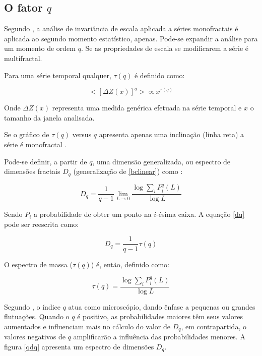 \documentclass{ufscThesis}
\begin{document}
\subsection{O fator $q$}
Segundo , a análise de invariância de escala aplicada a séries monofractais é aplicada ao segundo momento estatístico, apenas. Pode-se expandir a análise para um momento de ordem $q$. Se as propriedades de escala se modificarem a série é multifractal. \par
Para uma série temporal qualquer, $\tau(q)$ é definido como:

\begin{equation}
<[\Delta Z(x)]^{q}>  \propto x^{\tau(q)}
\label{medida}
\end{equation}

Onde $\Delta Z(x)$ representa uma medida genérica efetuada na série temporal e $x$ o tamanho da janela analisada. \par
Se o gráfico de $\tau(q)$ versus $q$ apresenta apenas uma inclinação (linha reta) a série é monofractal \cite{Biswas2012}.

Pode-se definir, a partir de $q$, uma dimensão generalizada, ou espectro de dimensões fractais $D_{q}$ (generalização de \ref{bclinear}) como \cite{feder1988fractals,Chhabra1989}:

\begin{equation}
D_{q} = \frac{1}{q-1} \lim_{L\rightarrow0} \frac{\log\sum_{i} P_{i}^{q}(L)}{\log L}
\label{dq}
\end{equation}

Sendo $P_{i}$ a probabilidade de obter um ponto na $i$-ésima caixa. A equação \ref{dq} pode ser reescrita como:

\begin{equation}
D_{q} = \frac{1}{q-1} \tau(q)
\end{equation}

O espectro de massa ($\tau(q)$) é, então, definido como:

\begin{equation}
\tau(q) = \frac{\log\sum_{i} P_{i}^{q}(L)}{\log L}
\end{equation}

Segundo , o índice $q$ atua como microscópio, dando ênfase a pequenas ou grandes flutuações. Quando o $q$ é positivo, as probabilidades maiores têm seus valores aumentados e influenciam mais no cálculo do valor de $D_{q}$, em contrapartida, o valores negativos de $q$ amplificarão a influência das probabilidades menores. A figura \ref{qdq} apresenta um espectro de dimensões $D_{q}$.
\end{document}

